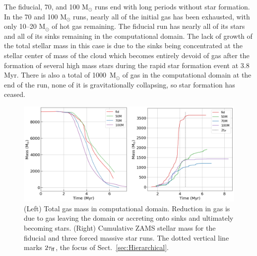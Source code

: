 \documentclass[twoside]{drexel-thesis}
\begin{document}
\begin{thesis}
The fiducial, 70, and 100 M$_{\odot}$ runs end with long periods without star formation. In the 70 and 100 M$_{\odot}$ runs, nearly all of the initial gas has been exhausted, with only 10--20 M$_{\odot}$ of hot gas remaining.
The fiducial run has nearly all of its stars and all of its sinks remaining in the computational domain. The lack of growth of the total stellar mass in this case is due to the sinks being concentrated at the stellar center of mass of the cloud which becomes entirely devoid of gas after the formation of several high mass stars during the rapid star formation event at 3.8 Myr. There is also a total of 1000~M$_{\odot}$ of gas in the computational domain at the end of the run, none of it is gravitationally collapsing, so star formation has ceased. 
\begin{figure}[!htb]
    \centering
    \includegraphics[width=\linewidth]{gas_mass_cum_stellar_mass_combo.png}
    \caption{(Left) Total gas mass in computational domain. Reduction in gas is due to gas leaving the domain or accreting onto sinks and ultimately becoming stars. (Right) Cumulative ZAMS stellar mass for the fiducial and three forced massive star runs. The dotted vertical line marks $2\tau_{\rm ff}$, the focus of Sect.~\ref{sec:Hierarchical}.}
    \label{fig:gas_mass_cum_star_mass_combo}
\end{figure}


\end{thesis}
\end{document}
